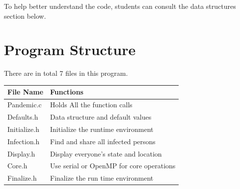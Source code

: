 \documentclass[letterpaper,10pt,openany,oneside]{sphinxmanual}
\begin{document}
To help better understand the code, students can consult the data
structures section below.


\chapter{Program Structure}
\label{1-ProgramStructure/programstructure:program-structure}\label{1-ProgramStructure/programstructure::doc}

There are in total 7 files in this program.

\begin{tabulary}{\linewidth}{|L|L|}
\hline
\textbf{
File Name
} & \textbf{
Functions
}\\\hline

Pandemic.c
 & 
Holds All the function calls
\\\hline

Defaults.h
 & 
Data structure and default values
\\\hline

Initialize.h
 & 
Initialize the runtime environment
\\\hline

Infection.h
 & 
Find and share all infected persons
\\\hline

Display.h
 & 
Display everyone's state and location
\\\hline

Core.h
 & 
Use serial or OpenMP for core operations
\\\hline

Finalize.h
 & 
Finalize the run time environment
\\\hline
\end{tabulary}
\end{document}
